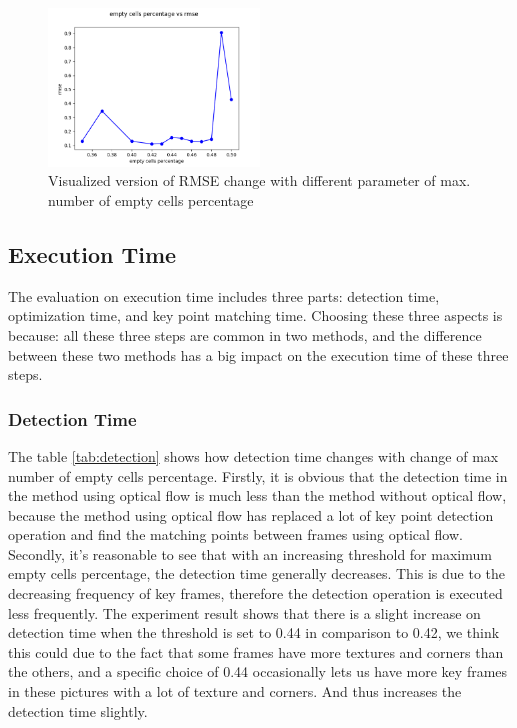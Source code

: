\documentclass[conference]{IEEEtran}
\begin{document}
\begin{figure}
	\label{fig:max_empty_cell}
	\centering
	\includegraphics[width=0.5\textwidth]{img/max_num_empty_cell1.png}
	\caption{Visualized version of RMSE change with different parameter of max. number of empty cells percentage}
\end{figure}


\subsection{Execution Time}
The evaluation on execution time includes three parts: detection time, optimization time, and key point matching time. Choosing these three aspects is because: all these three steps are common in two methods, and the difference between these two methods has a big impact on the execution time of these three steps.


\subsubsection{Detection Time}
The table \ref{tab:detection} shows how detection time changes with change of max number of empty cells percentage. Firstly, it is obvious that the detection time in the method using optical flow is much less than the method without optical flow, because the method using optical flow has replaced a lot of key point detection operation and find the matching points between frames using optical flow. Secondly, it's reasonable to see that with an increasing threshold for maximum empty cells percentage, the detection time generally decreases. This is due to the decreasing frequency of key frames, therefore the detection operation is executed less frequently. The experiment result shows that there is a slight increase on detection time when the threshold is set to 0.44 in comparison to 0.42, we think this could due to the fact that some frames have more textures and corners than the others, and a specific choice of 0.44 occasionally lets us have more key frames in these pictures with a lot of texture and corners. And thus increases the detection time slightly.  
\end{document}
